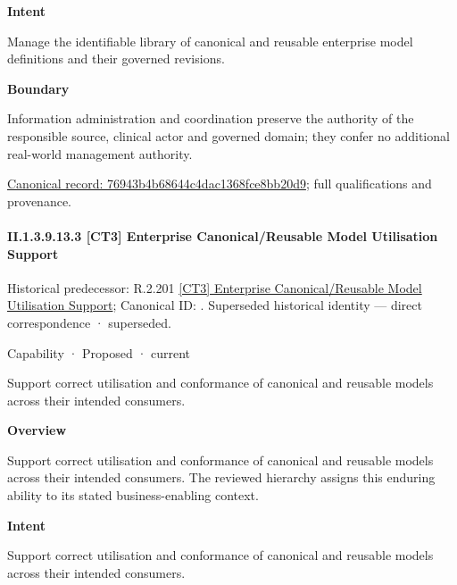 \textbf{Intent}



Manage the identifiable library of canonical and reusable enterprise model definitions and their governed revisions.



\textbf{Boundary}



Information administration and coordination preserve the authority of the responsible source, clinical actor and governed domain; they confer no additional real-world management authority.


{\footnotesize \href{../../../../continuum/strategy/capability/76943b4b68644c4dac1368fce8bb20d9.md}{Canonical record: 76943b4b68644c4dac1368fce8bb20d9}; full qualifications and provenance.}\par
\paragraph*{II.1.3.9.13.3 [CT3] Enterprise Canonical/Reusable Model Utilisation Support}
\label{navigation:II.1.3.9.13.3}

{\small Historical predecessor: R.2.201 \hyperref[element:7ae95677a00346f18a0ba01522a20153]{[CT3] Enterprise Canonical/Reusable Model Utilisation Support}; Canonical ID: \texttt{}. Superseded historical identity — direct correspondence · superseded.}\par
\label{element:5744cb9d86494064af87afb3cbf2cf97}
{\small Capability · Proposed · current}\par

Support correct utilisation and conformance of canonical and reusable models across their intended consumers.



\textbf{Overview}



Support correct utilisation and conformance of canonical and reusable models across their intended consumers. The reviewed hierarchy assigns this enduring ability to its stated business-enabling context.



\textbf{Intent}



Support correct utilisation and conformance of canonical and reusable models across their intended consumers.



